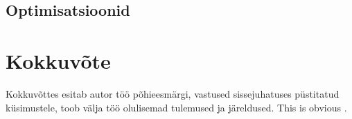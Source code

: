 \documentclass[a4paper,12pt]{article}
\begin{document}
\subsection{Optimisatsioonid}



\iffalse
\clearpage\vspace*{0pt}
\section{Võimalikud edasiarendused}

- muteeritava oleku laiendused\\
- mittedeterminismi teine gradeering nd0, 1, 01, 1+, N ja selle optimisatsioonid (pure-lambda-hoist, dead-computation)

\begin{figure}
  \begin{BVerbatim}
  \end{BVerbatim}
  \caption{}
  \label{fig:nd.something}
\end{figure}

\fi

\clearpage\vspace*{0pt}


\section{Kokkuvõte}
Kokkuvõttes esitab autor töö põhieesmärgi, vastused sissejuhatuses püstitatud
küsimustele, toob välja töö olulisemad tulemused ja järeldused.
This is obvious \cite{Benton2016}. \cite{Katsumata2014}
\clearpage\vspace*{0pt}


\renewcommand{\baselinestretch}{1.15}
\small



\end{document}
